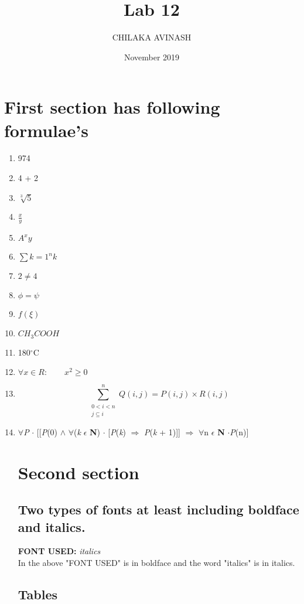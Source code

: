 \documentclass[12pt, letterpaper, twoside]{article}
\title{Lab 12}
\author{CHILAKA AVINASH}
\date{November 2019}
\begin{document}
 
\maketitle
 \section{First section has following formulae's}
\begin{enumerate}[label=(\alph*)]
\item 974\
\item 4 + 2\
\item $\sqrt[3]{5}$
\item $\frac{x}{y}$
\item $A^x{y}$
\item  $\sum{k}=  1^n{k}$
\item ${2}\neq{4}$
\item $\phi = \psi$
\item $f(\xi)$
\item ${CH_3COOH}$
\item 180$^\circ${C}
\item $\forall{x}\in{R}:\qquad{x^2}\geq{0}$
\item \[
\sum_{\substack{0<i<n \\ j\subseteq i }}^{n} \textit{Q}(\textit{i},\textit{j}) = \textit{P}(\textit{i},\textit{j}) \times \textit{R}(\textit{i},\textit{j})\]
\item  $\forall$\textit{P} $\cdot$ [[\textit{P}(0) $\wedge$ $\forall$(\textit{k} $\epsilon$ \textbf{N}) $\cdot$ [\textit{P}(\textit{k}) $\Longrightarrow$ \textit{P}(\textit{k} + 1)]] $\Longrightarrow$ $\forall$n $\epsilon$ \textbf{N} $\cdot$\textit{P}(n)] \
\section{Second section}
\subsection{Two types of fonts at least including boldface and italics.}
\textbf{FONT USED:}
\textit{italics}\\
{\fontfamily{qcr}\selectfont In the above "FONT USED" is in boldface and the word "italics" is in italics.}\\

\subsection{Tables} 


\end{enumerate}
\end{document}
